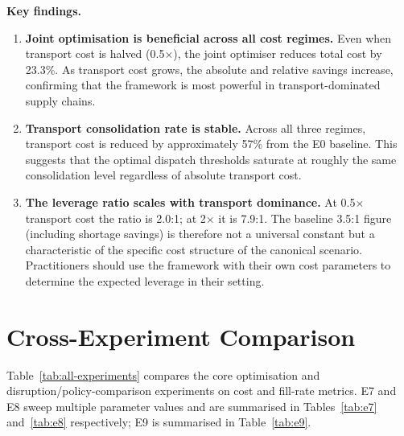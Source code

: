 \textbf{Key findings.}
\vspace{-2em}
\begin{enumerate}
  \item \textbf{Joint optimisation is beneficial across all cost regimes.}
        Even when transport cost is halved (0.5$\times$), the joint
        optimiser reduces total cost by 23.3\%.  As transport cost grows,
        the absolute and relative savings increase, confirming that the
        framework is most powerful in transport-dominated supply chains.
  \item \textbf{Transport consolidation rate is stable.}  Across all
        three regimes, transport cost is reduced by approximately 57\%
        from the E0 baseline.  This suggests that the optimal dispatch
        thresholds saturate at roughly the same consolidation level
        regardless of absolute transport cost.
  \item \textbf{The leverage ratio scales with transport dominance.}
        At 0.5$\times$ transport cost the ratio is 2.0:1; at 2$\times$
        it is 7.9:1.  The baseline 3.5:1 figure (including shortage
        savings) is therefore not a universal constant but a characteristic
        of the specific cost structure of the canonical scenario.
        Practitioners should use the framework with their own cost
        parameters to determine the expected leverage in their setting.
\end{enumerate}

\section{Cross-Experiment Comparison}
\label{sec:results:compare}

Table~\ref{tab:all-experiments} compares the core optimisation and
disruption/policy-comparison experiments on cost and fill-rate metrics.
E7 and E8 sweep multiple parameter values and are summarised in
Tables~\ref{tab:e7} and~\ref{tab:e8} respectively; E9 is summarised
in Table~\ref{tab:e9}.

